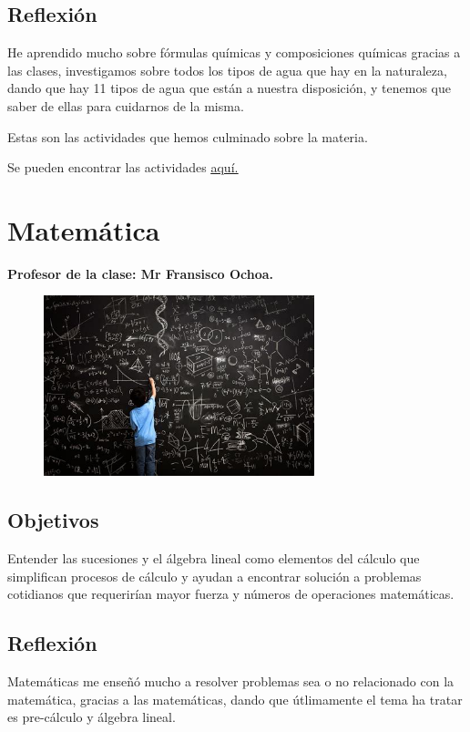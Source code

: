 \documentclass[a4paper, 12pt]{article}
\begin{document}
\subsection{Reflexión}
He aprendido mucho sobre fórmulas químicas y composiciones químicas gracias a las clases, investigamos sobre todos los tipos de agua que hay en la naturaleza, dando que hay 11 tipos de agua que están a nuestra disposición, y tenemos que saber de ellas para cuidarnos de la misma.

Estas son las actividades que hemos culminado sobre la materia.

Se pueden encontrar las actividades \href{https://drive.google.com/drive/folders/1sVpbMzXSFN_uNBDNxBb1wdva3F2rRT37?usp=sharing}{\underline{aquí.}}

\section{Matemática}
\textbf{Profesor de la clase: Mr Fransisco Ochoa.}
\begin{figure}[h!]
  \includegraphics[width=0.7\textwidth, center]{math.jpeg}
\end{figure}

\subsection{Objetivos}
Entender las sucesiones y el álgebra lineal como elementos del cálculo que simplifican procesos de cálculo y ayudan a encontrar solución a problemas cotidianos que requerirían mayor fuerza y números de operaciones matemáticas.

\subsection{Reflexión}

Matemáticas me enseñó mucho a resolver problemas sea o no relacionado con la matemática, gracias a las matemáticas, dando que útlimamente el tema ha tratar es pre-cálculo y álgebra lineal.
\end{document}
